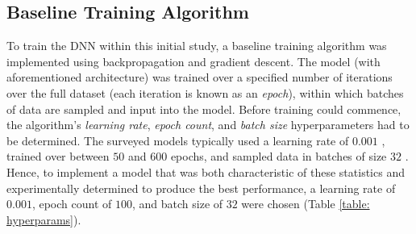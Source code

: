 \documentclass[a4paper, 11pt]{report}
\begin{document}
    \subsection{Baseline Training Algorithm}

    To train the DNN within this initial study, a baseline training algorithm was implemented using backpropagation and gradient descent. The model (with aforementioned architecture) was trained over a specified number of iterations over the full dataset (each iteration is known as an \emph{epoch}), within which batches of data are sampled and input into the model. Before training could commence, the algorithm's \emph{learning rate}, \emph{epoch count}, and \emph{batch size} hyperparameters had to be determined. The surveyed models typically used a learning rate of $0.001$ \citep{zhang-2022}, trained over between $50$ \citep{rahimikia-2020} and $600$ \citep{xiong-2016} epochs, and sampled data in batches of size $32$ \citep{xiong-2016}. Hence, to implement a model that was both characteristic of these statistics and experimentally determined to produce the best performance, a learning rate of $0.001$, epoch count of $100$, and batch size of $32$ were chosen (Table  \ref{table: hyperparams}).
\end{document}
